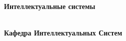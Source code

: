 \thispagestyle{empty}

\vspace{3cm}
  \begin{center}
	\bfseries \Huge Интеллектуальные системы  \par   %
        ~\\
	\bfseries \LARGE Кафедра Интеллектуальных Систем \\   %
    \end{center}